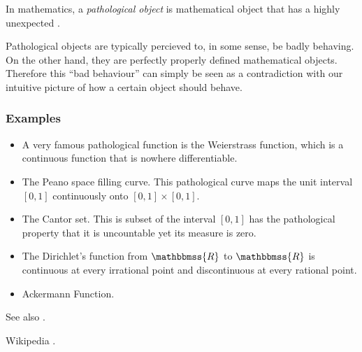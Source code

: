 \documentclass[12pt]{article}
\newcommand{\R}{\mathbbmss{R}}
\begin{document}
In mathematics, a \emph{pathological object} is mathematical
object that has a highly unexpected . 

Pathological objects are typically percieved to, in some sense, be 
badly behaving. On the other hand, they are perfectly properly
defined mathematical objects. Therefore this ``bad behaviour'' can
simply be seen as a contradiction with our intuitive 
picture of how a certain object should behave. 

\subsubsection*{Examples}
\begin{itemize}
\item A very famous pathological function is the 
Weierstrass function, which is a continuous function 
that is nowhere differentiable. 
\item The Peano space filling curve. This pathological curve
maps the unit interval $[0,1]$ continuously onto $[0,1]\times [0,1]$. 
\item The Cantor set. This is subset of the interval $[0,1]$
has the pathological property that it is uncountable 
yet its measure is zero. 
\item The Dirichlet's function from $\R$ to $\R$ is continuous at every
irrational point and discontinuous at every rational point. 
\item Ackermann Function.
\end{itemize}

See also \cite{wiki}. 

\begin{thebibliography}{9}
Wikipedia . 
\end{thebibliography}
\end{document}
